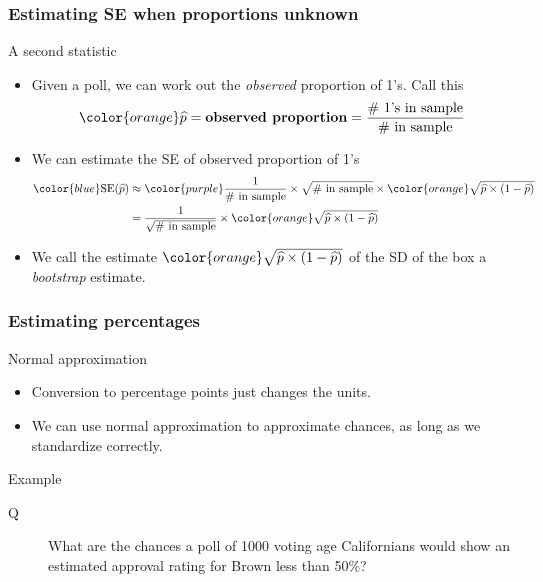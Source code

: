 \documentclass[handout]{beamer}
\begin{document}
   \begin{frame} \frametitle{Estimating SE when proportions unknown}

   \begin{block}
   {A second statistic}
   \begin{itemize}
   \item Given a poll, we can work out the {\em observed}
   proportion of 1's. Call this
   $$
   {\color{orange} \widehat{p}} = \text{\bf observed proportion} = \frac{\text{\# 1's in sample}}{\text{\# in sample}}
   $$
   \item We can estimate the SE of observed proportion of 1's
   $$
   \begin{aligned}
   {\color{blue} \text{SE}(\widehat{p})}& \approx {\color{purple} \frac{1}{\text{\# in sample}}}  \times  \sqrt{\text{\# in sample}} \times
   {\color{orange} \sqrt{\widehat{p} \times (1 - \widehat{p})}} \\
   & = \frac{1}{\sqrt{\text{\# in sample}}} \times
   {\color{orange} \sqrt{\widehat{p} \times (1 - \widehat{p})}} \\
   \end{aligned}
   $$

   \item We call the estimate ${\color{orange} \sqrt{\widehat{p} \times (1 - \widehat{p})}}$ of the SD of the box a {\color{orange} {\em bootstrap}} estimate.

   \end{itemize}
   \end{block}
   \end{frame}


   \begin{frame} \frametitle{Estimating percentages}

   \begin{block}
   {Normal approximation}
   \begin{itemize}
   \item Conversion to percentage points just changes the units.
   \item We can use normal approximation to approximate chances,
   as long as we standardize correctly.

   \end{itemize}
   \end{block}

   \begin{block}
   {Example}
   \begin{description}
   \item[Q] What are the chances a poll of 1000 voting age Californians
   would show an estimated approval rating for Brown less than 50\%?


   \end{description}
   \end{block}
   \end{frame}
\end{document}
